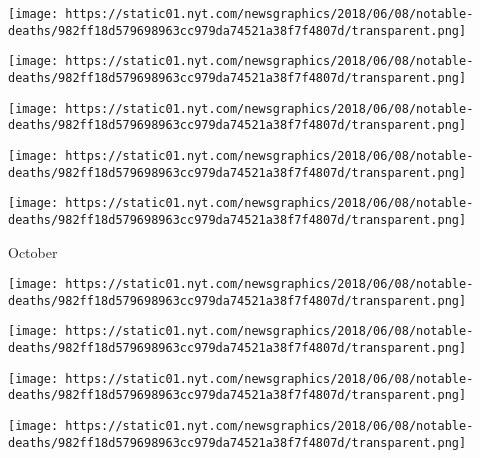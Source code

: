 \href{https://www.nytimes.com/2018/11/04/movies/raymond-chow-dead.html}{}

\texttt{[image: https://static01.nyt.com/newsgraphics/2018/06/08/notable-deaths/982ff18d579698963cc979da74521a38f7f4807d/transparent.png]}

\href{https://www.nytimes.com/2018/11/03/obituaries/hardy-fox-dead.html}{}

\texttt{[image: https://static01.nyt.com/newsgraphics/2018/06/08/notable-deaths/982ff18d579698963cc979da74521a38f7f4807d/transparent.png]}

\href{https://www.nytimes.com/2018/11/03/obituaries/roy-hargrove-dead-jazz-trumpeter.html}{}

\texttt{[image: https://static01.nyt.com/newsgraphics/2018/06/08/notable-deaths/982ff18d579698963cc979da74521a38f7f4807d/transparent.png]}

\href{https://www.nytimes.com/2018/11/02/obituaries/jin-yong-dead.html}{}

\texttt{[image: https://static01.nyt.com/newsgraphics/2018/06/08/notable-deaths/982ff18d579698963cc979da74521a38f7f4807d/transparent.png]}

\href{https://www.nytimes.com/2018/11/01/obituaries/sonny-fortune-dead.html}{}

\texttt{[image: https://static01.nyt.com/newsgraphics/2018/06/08/notable-deaths/982ff18d579698963cc979da74521a38f7f4807d/transparent.png]}

October

\href{https://www.nytimes.com/2018/10/31/obituaries/willie-mccovey-dead.html}{}

\texttt{[image: https://static01.nyt.com/newsgraphics/2018/06/08/notable-deaths/982ff18d579698963cc979da74521a38f7f4807d/transparent.png]}

\href{https://www.nytimes.com/2018/10/31/obituaries/maria-irene-fornes-dead.html}{}

\texttt{[image: https://static01.nyt.com/newsgraphics/2018/06/08/notable-deaths/982ff18d579698963cc979da74521a38f7f4807d/transparent.png]}

\href{https://www.nytimes.com/2018/10/30/obituaries/whitey-bulger-dead.html}{}

\texttt{[image: https://static01.nyt.com/newsgraphics/2018/06/08/notable-deaths/982ff18d579698963cc979da74521a38f7f4807d/transparent.png]}

\href{https://www.nytimes.com/2018/10/30/obituaries/rico-puno-dead.html}{}

\texttt{[image: https://static01.nyt.com/newsgraphics/2018/06/08/notable-deaths/982ff18d579698963cc979da74521a38f7f4807d/transparent.png]}

